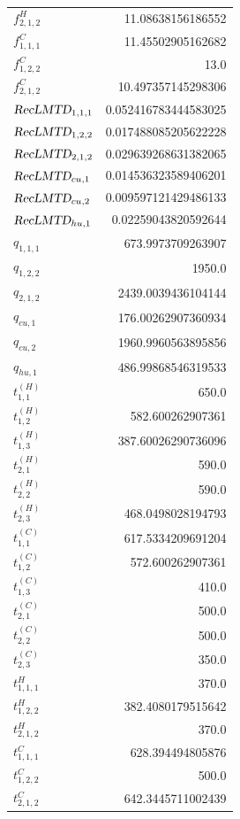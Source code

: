 \documentclass{article}%
\begin{document}
\begin{multicols*}{3}
\begin{supertabular}{lr}
	$f_{2,1,2}^{H}$ & 11.08638156186552 \\%
	$f_{1,1,1}^{C}$ & 11.45502905162682 \\%
	$f_{1,2,2}^{C}$ & 13.0 \\%
	$f_{2,1,2}^{C}$ & 10.497357145298306 \\%
	$\textsl{RecLMTD}_{1,1,1}$ & 0.052416783444583025 \\%
	$\textsl{RecLMTD}_{1,2,2}$ & 0.017488085205622228 \\%
	$\textsl{RecLMTD}_{2,1,2}$ & 0.029639268631382065 \\%
	$\textsl{RecLMTD}_{cu,1}$ & 0.014536323589406201 \\%
	$\textsl{RecLMTD}_{cu,2}$ & 0.009597121429486133 \\%
	$\textsl{RecLMTD}_{hu,1}$ & 0.02259043820592644 \\%
	$q_{1,1,1}$ & 673.9973709263907 \\%
	$q_{1,2,2}$ & 1950.0 \\%
	$q_{2,1,2}$ & 2439.0039436104144 \\%
	$q_{cu,1}$ & 176.00262907360934 \\%
	$q_{cu,2}$ & 1960.9960563895856 \\%
	$q_{hu,1}$ & 486.99868546319533 \\%
	$t_{1,1}^{(H)}$ & 650.0 \\%
	$t_{1,2}^{(H)}$ & 582.600262907361 \\%
	$t_{1,3}^{(H)}$ & 387.60026290736096 \\%
	$t_{2,1}^{(H)}$ & 590.0 \\%
	$t_{2,2}^{(H)}$ & 590.0 \\%
	$t_{2,3}^{(H)}$ & 468.0498028194793 \\%
	$t_{1,1}^{(C)}$ & 617.5334209691204 \\%
	$t_{1,2}^{(C)}$ & 572.600262907361 \\%
	$t_{1,3}^{(C)}$ & 410.0 \\%
	$t_{2,1}^{(C)}$ & 500.0 \\%
	$t_{2,2}^{(C)}$ & 500.0 \\%
	$t_{2,3}^{(C)}$ & 350.0 \\%
	$t_{1,1,1}^{H}$ & 370.0 \\%
	$t_{1,2,2}^{H}$ & 382.4080179515642 \\%
	$t_{2,1,2}^{H}$ & 370.0 \\%
	$t_{1,1,1}^{C}$ & 628.394494805876 \\%
	$t_{1,2,2}^{C}$ & 500.0 \\%
	$t_{2,1,2}^{C}$ & 642.3445711002439 \\%

\end{supertabular}
\end{multicols*}
\end{document}
